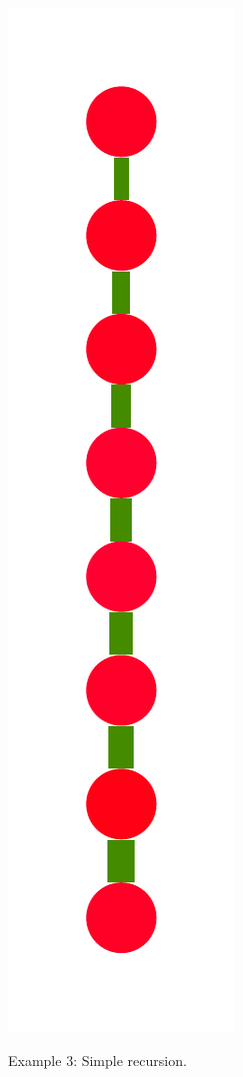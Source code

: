 \documentclass[a4paper,10pt]{article}
\begin{document}
\begin{figure}
{    \includegraphics[scale=.14]{../figures/vector/6-3-recursion-induced-8.pdf}
    \label{fig:exp-simple-recursion-induced}    
    }
  \caption{Example 3: Simple recursion.}
  \label{fig:exp-simple-recursion}
\end{figure}
\end{document}
